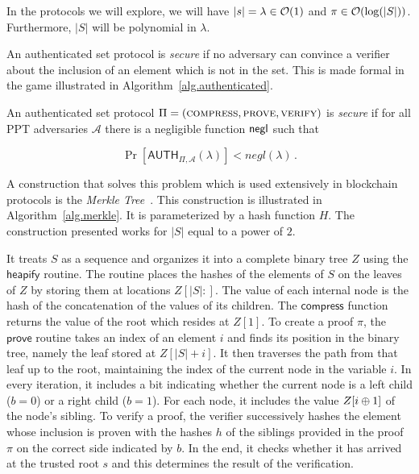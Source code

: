 In the protocols we will explore, we will have $|s| = \lambda \in \mathcal{O}(1)$ and
$\pi \in \mathcal{O}(\log(|S|))$. Furthermore, $|S|$ will be polynomial in $\lambda$.

An authenticated set protocol is \emph{secure} if no adversary can
convince a verifier about the inclusion of an element which is not in the
set. This is made formal in the game illustrated in
Algorithm~\ref{alg.authenticated}.



\begin{definition}[Security]
  An authenticated set protocol $\Pi = (\textsc{compress},\allowbreak \textsc{prove},\allowbreak \textsc{verify})$ is \emph{secure} if for all PPT adversaries $\mathcal{A}$
  there is a negligible function $\mathsf{negl}$ such that

  \[
    \Pr[\textsf{AUTH}_{\Pi,\mathcal{A}}(\lambda)] < negl(\lambda)\,.
  \]
\end{definition}

A construction that solves this problem which is used extensively in blockchain
protocols is the \emph{Merkle Tree}~\cite{merkle}. This construction is
illustrated in Algorithm~\ref{alg.merkle}. It is parameterized by a hash
function $H$. The construction presented works for $|S|$ equal to a power of
$2$.

It treats $S$ as a sequence and organizes it into a complete binary tree $Z$
using the $\textsf{heapify}$ routine. The routine places the hashes of the
elements of $S$ on the leaves of $Z$ by storing them at locations $Z[|S|{:}]$.
The value of each internal node is the hash of the concatenation of the values
of its children. The $\textsf{compress}$ function returns the value of the root
which resides at $Z[1]$. To create a proof $\pi$, the $\textsf{prove}$ routine
takes an index of an element $i$ and finds its position in the binary tree,
namely the leaf stored at $Z[|S| + i]$. It then traverses the path from that
leaf up to the root, maintaining the index of the current node in the variable
$i$. In every iteration, it includes a bit indicating whether the current node
is a left child ($b = 0$) or a right child ($b = 1$). For each node, it includes
the value $Z[i \oplus 1]$ of the node's sibling. To verify a proof, the verifier
successively hashes the element whose inclusion is proven with the hashes $h$ of
the siblings provided in the proof $\pi$ on the correct side indicated by $b$.
In the end, it checks whether it has arrived at the trusted root $s$ and this
determines the result of the verification.

